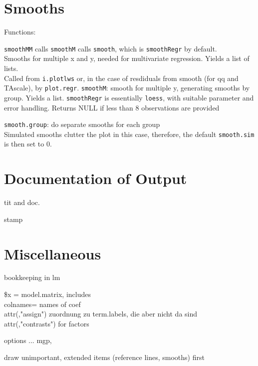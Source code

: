 \documentclass[11pt]{article}
\def\code{\texttt}
\begin{document}
\section{Smooths}
Functions:

\Itm
\code{smoothMM} calls \code{smoothM} calls \code{smooth}, 
which is \code{smoothRegr} by default.\\
Smooths for multiple x and y, needed for multivariate regression.
Yields a list of lists.\\
Called from \code{i.plotlws} or, in the case of
resdiduals from smooth (for qq and TAscale), by \code{plot.regr}.
\Itm
\code{smoothM}: smooth for multiple y, generating smooths by group. 
Yields a list.
\Itm
\code{smoothRegr} is essentially \code{loess}, with suitable parameter and
error handling. Returns NULL if less than 8 observations are provided

\code{smooth.group}: do separate smooths for each group\\
Simulated smooths clutter the plot in this case, therefore, the default
\code{smooth.sim} is then set to 0.

\section{Documentation of Output}
tit and doc.

stamp

\section{Miscellaneous}
\Itm
bookkeeping in lm

\$x = model.matrix, includes\\
  colnames= names of coef\\
  attr(,"assign") zuordnung zu term.labels, die aber nicht da sind\\
  attr(,"contrasts") for factors

\Itm
options ... mgp, 

\Itm
draw unimportant, extended items (reference lines, smooths) first
\end{document}
